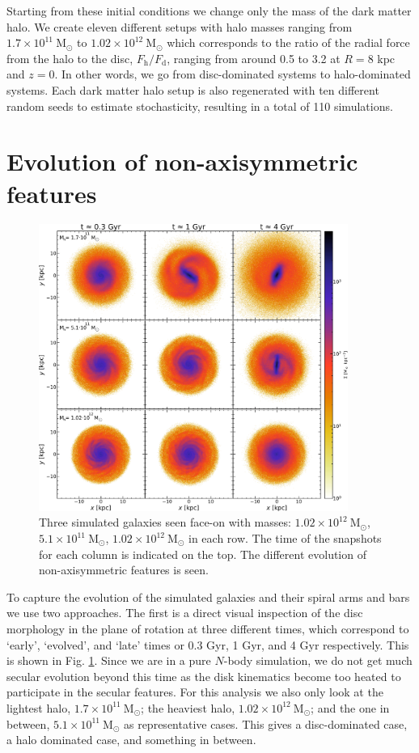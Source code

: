 Starting from these initial conditions we change only the mass of the dark matter halo. We create eleven different setups with halo masses ranging from $1.7\times 10^{11}\ \mathrm{M}_\odot$ to $1.02\times 10^{12}\ \mathrm{M}_\odot$ which corresponds to the ratio of the radial force from the halo to the disc, $F_\mathrm{h}/F_\mathrm{d}$, ranging from around 0.5 to 3.2 at $R = 8$ kpc and $z = 0$. In other words, we go from disc-dominated systems to halo-dominated systems. Each dark matter halo setup is also regenerated with ten different random seeds to estimate stochasticity, resulting in a total of 110 simulations.

\section{Evolution of non-axisymmetric features}\label{sec:p1-evolution}
\begin{figure}[t]
    \centering
    \includegraphics[width=0.9\textwidth]{images/evolution.pdf}
    \caption{Three simulated galaxies seen face-on with masses: $1.02\times 10^{12}\ \mathrm{M}_\odot$,  $5.1\times 10^{11}\ \mathrm{M}_\odot$, $1.02\times 10^{12}\ \mathrm{M}_\odot$ in each row. The time of the snapshots for each column is indicated on the top. The different evolution of non-axisymmetric features is seen.} %
    \label{fig:evolution}
\end{figure}
To capture the evolution of the simulated galaxies and their spiral arms and bars we use two approaches. The first is a direct visual inspection of the disc morphology in the plane of rotation at three different times, which correspond to `early', `evolved', and `late' times or 0.3 Gyr, 1 Gyr, and 4 Gyr respectively. This is shown in Fig. \ref{fig:evolution}. Since we are in a pure $N$-body simulation, we do not get much secular evolution beyond this time as the disk kinematics become too heated to participate in the secular features. For this analysis we also only look at the lightest halo, $1.7\times 10^{11}\ \mathrm{M}_\odot$; the heaviest halo, $1.02\times 10^{12}\ \mathrm{M}_\odot$; and the one in between, $5.1\times 10^{11}\ \mathrm{M}_\odot$ as representative cases. This gives a disc-dominated case, a halo dominated case, and something in between. 

